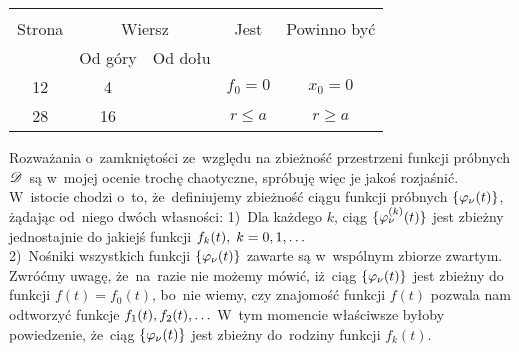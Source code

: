 \documentclass[a4paper,11pt]{article}
\begin{document}


\begin{center}
  \begin{tabular}{|c|c|c|c|c|}
    \hline
    & \multicolumn{2}{c|}{} & & \\
    Strona & \multicolumn{2}{c|}{Wiersz} & Jest
                              & Powinno być \\ \cline{2-3}
    & Od góry & Od dołu & & \\
    \hline
    12  &  4 & & $f_{ 0 } = 0$ & $x_{ 0 } = 0$ \\
    28  & 16 & & $r \leq a$ & $r \geq a$ \\
    \hline
  \end{tabular}
\end{center}

\vspace{\spaceTwo}



\newpage
{}



\noi {}

\vspace{\spaceFour}


\start {} Rozważania o~zamkniętości ze~względu na zbieżność
przestrzeni funkcji próbnych $\mathcal{D}$~są w~mojej ocenie trochę
chaotyczne, spróbuję więc je jakoś rozjaśnić. W~istocie chodzi o~to,
że~definiujemy zbieżność ciągu funkcji próbnych
$\{  \varphi_{ \nu }( t )  \}$, żądając od~niego dwóch własności: 1)~Dla
każdego $k$, ciąg $\{  \varphi_{ \nu }^{ ( k ) }( t )  \}$ jest zbieżny
jednostajnie do jakiejś funkcji
$f_{ k }( t ), \; k = 0, 1, \ldots$ \\
2)~Nośniki wszystkich funkcji $\{  \varphi_{ \nu }( t )  \}$ zawarte są
w~wspólnym zbiorze zwartym. \\
Zwróćmy uwagę, że~na~razie nie możemy mówić, iż~ciąg
$\{  \varphi_{ \nu }( t )  \}$ jest zbieżny do funkcji
$f( t ) = f_{ 0 }( t )$, bo~nie wiemy, czy znajomość funkcji $f( t )$
pozwala nam odtworzyć funkcje $f_{ 1 }( t ), f_{ 2 }( t ), \ldots$ W~tym
momencie właściwsze byłoby powiedzenie, że~ciąg
$\{  \varphi_{ \nu }( t )  \}$ jest zbieżny do~rodziny funkcji
$f_{ k }( t )$.
\end{document}
